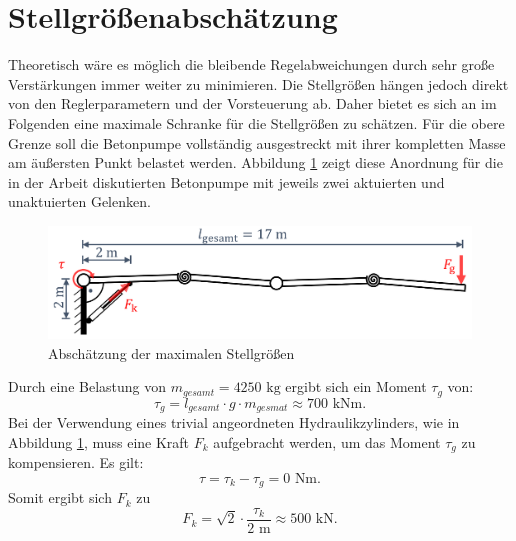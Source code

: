 \section{Stellgrößenabschätzung}
Theoretisch wäre es möglich die bleibende Regelabweichungen durch sehr große Verstärkungen immer weiter zu minimieren. Die Stellgrößen hängen jedoch direkt von den Reglerparametern und der Vorsteuerung ab. Daher bietet es sich an im Folgenden eine maximale Schranke für die Stellgrößen zu schätzen. \newline
Für die obere Grenze soll die Betonpumpe vollständig ausgestreckt mit ihrer kompletten Masse am äußersten Punkt belastet werden. Abbildung \ref{fig:Stellgroessenabschaetzung} zeigt diese Anordnung für die in der Arbeit diskutierten Betonpumpe mit jeweils zwei aktuierten und unaktuierten Gelenken.   
\newline
	\begin{figure}[h!]
		\centering
		\includegraphics[scale=0.6]{Bilder/Stelgroessenabschaetzung.pdf}
		\caption{Abschätzung der maximalen Stellgrößen}
		\label{fig:Stellgroessenabschaetzung}
	\end{figure}\newline
Durch eine Belastung von $m_{gesamt} = 4250\text{ kg}$ ergibt sich ein Moment $\tau_g$ von:
	\begin{equation}
		\tau_g = l_{gesamt}\cdot g\cdot m_{gesmat}\approx 700 \text{ kNm}.
	\end{equation}  
Bei der Verwendung eines trivial angeordneten Hydraulikzylinders, wie in Abbildung \ref{fig:Stellgroessenabschaetzung}, muss eine Kraft $F_k$ aufgebracht werden, um das Moment $\tau_g$ zu kompensieren.  Es gilt:
	\begin{equation}
		\tau = \tau_k-\tau_g = 0 \text{ Nm}.
	\end{equation}
Somit ergibt sich $F_k$ zu
	\begin{equation}
		F_k = \sqrt{2}\cdot \frac{\tau_k}{2\text{ m}} \approx 500\text{ kN}.
	\end{equation}

